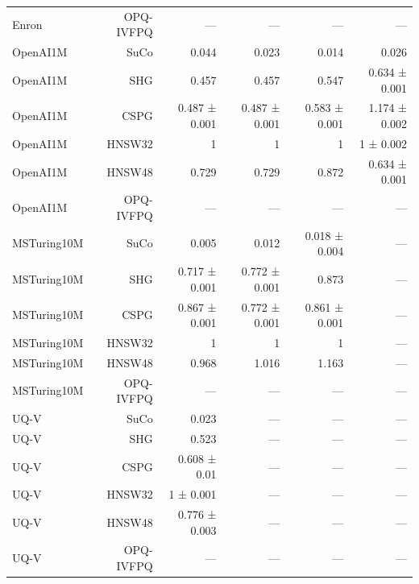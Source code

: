\begin{table}[t]
\begin{tabular}{lrrrrr}
Enron & OPQ-IVFPQ & — & — & — & — \\
OpenAI1M & SuCo & 0.044 & 0.023 & 0.014 & 0.026 \\
OpenAI1M & SHG & 0.457 & 0.457 & 0.547 & 0.634 ± 0.001 \\
OpenAI1M & CSPG & 0.487 ± 0.001 & 0.487 ± 0.001 & 0.583 ± 0.001 & 1.174 ± 0.002 \\
OpenAI1M & HNSW32 & 1 & 1 & 1 & 1 ± 0.002 \\
OpenAI1M & HNSW48 & 0.729 & 0.729 & 0.872 & 0.634 ± 0.001 \\
OpenAI1M & OPQ-IVFPQ & — & — & — & — \\
MSTuring10M & SuCo & 0.005 & 0.012 & 0.018 ± 0.004 & — \\
MSTuring10M & SHG & 0.717 ± 0.001 & 0.772 ± 0.001 & 0.873 & — \\
MSTuring10M & CSPG & 0.867 ± 0.001 & 0.772 ± 0.001 & 0.861 ± 0.001 & — \\
MSTuring10M & HNSW32 & 1 & 1 & 1 & — \\
MSTuring10M & HNSW48 & 0.968 & 1.016 & 1.163 & — \\
MSTuring10M & OPQ-IVFPQ & — & — & — & — \\
UQ-V & SuCo & 0.023 & — & — & — \\
UQ-V & SHG & 0.523 & — & — & — \\
UQ-V & CSPG & 0.608 ± 0.01 & — & — & — \\
UQ-V & HNSW32 & 1 ± 0.001 & — & — & — \\
UQ-V & HNSW48 & 0.776 ± 0.003 & — & — & — \\
UQ-V & OPQ-IVFPQ & — & — & — & — \\
\bottomrule
\end{tabular}
\end{table}
